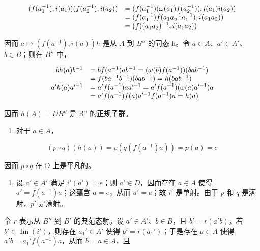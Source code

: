 \[
\begin{array}{r l} (f (a _ {1} ^ {- 1}), i (a _ {1})) (f (a _ {2} ^ {- 1}), i (a _ {2})) & = (f (a _ {1} ^ {- 1}) (\omega (a _ {1}) f (a _ {2} ^ {- 1})), i (a _ {1}) i (a _ {2})) \\ & = (f (a _ {1} ^ {- 1}) f (a _ {1} a _ {2} ^ {- 1} a _ {1} ^ {- 1}), i (a _ {1} a _ {2})) \\ & = (f ((a _ {1} a _ {2}) ^ {- 1}, i (a _ {1} a _ {2})) \end{array}
\]

因而 \(a \mapsto (f(a^{-1}), i(a))\)\(h\) 是从 \(A\) 到 \(B''\) 的同态 h。令 \(a \in A\)、\(a' \in A'\)、\(b \in B\)；则在 \(B''\) 中，

\[
\begin{array}{r l} b h (a) b ^ {- 1} & = b f (a ^ {- 1}) a b ^ {- 1} = (\omega (b) f (a ^ {- 1})) (b a b ^ {- 1}) \\ & = f (b a ^ {- 1} b ^ {- 1}) (b a b ^ {- 1}) = h (b a b ^ {- 1}) \\ a ^ {\prime} h (a) a ^ {\prime - 1} & = a ^ {\prime} f (a ^ {- 1}) a a ^ {\prime - 1} = a ^ {\prime} f (a ^ {- 1}) (\omega (a) a ^ {\prime - 1}) a \\ & = a ^ {\prime} f (a ^ {- 1}) f (a) a ^ {\prime - 1} f (a ^ {- 1}) a = h (a) \end{array}
\]

因而 \(h(A) = D\)\(B''\) 是 B'' 的正规子群。

\begin{enumerate}
\def\labelenumi{(\roman{enumi})}
\setcounter{enumi}{1}
\tightlist
\item
  对于 \(a \in A\)，
\end{enumerate}

\[
(p \circ q) (h (a)) = p (q (f (a ^ {- 1}) a)) = p (a) = e
\]

因而 \(p \circ q\) 在 D 上是平凡的。

\begin{enumerate}
\def\labelenumi{(\roman{enumi})}
\setcounter{enumi}{2}
\tightlist
\item
  设 \(a' \in A'\) 满足 \(i'(a') = e\)；则 \(a' \in D\)，因而存在 \(a \in A\) 使得 \(a' = f(a^{-1})a\)；这蕴含 \(a = e\)，从而 \(a' = e\)；故 \(i'\) 是单射。由于 \(p\) 和 \(q\) 是满射，\(p'\) 是满射。
\end{enumerate}

令 \(r\) 表示从 \(B''\) 到 \(B'\) 的典范态射。设 \(a' \in A'\)、\(b \in B\)，且 \(b' = r(a'b)\)。若 \(b' \in \operatorname{Im}(i')\)，则存在 \(a_1' \in A'\) 使得 \(b' = r(a_1')\)；于是存在 \(a \in A\) 使得 \(a'b = a_1'f(a^{-1})a\)，从而 \(b = a \in A\)，且

